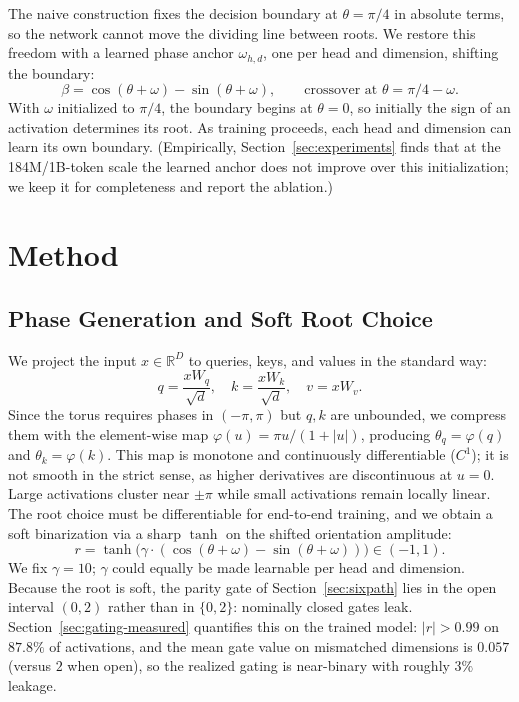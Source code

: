 \documentclass{article}
\newcommand{\R}{\mathbb{R}}
\begin{document}
The naive construction fixes the decision boundary at $\theta = \pi/4$ in absolute terms, so the network cannot move the dividing line between roots. We restore this freedom with a learned phase anchor $\omega_{h,d}$, one per head and dimension, shifting the boundary:
\begin{equation}
\beta = \cos(\theta + \omega) - \sin(\theta + \omega), \qquad \text{crossover at } \theta = \pi/4 - \omega.
\end{equation}
With $\omega$ initialized to $\pi/4$, the boundary begins at $\theta = 0$, so initially the sign of an activation determines its root. As training proceeds, each head and dimension can learn its own boundary. (Empirically, Section~\ref{sec:experiments} finds that at the 184M/1B-token scale the learned anchor does not improve over this initialization; we keep it for completeness and report the ablation.)

\section{Method}
\label{sec:method}

\subsection{Phase Generation and Soft Root Choice}
\label{sec:phasegen}

We project the input $x \in \R^D$ to queries, keys, and values in the standard way:
\begin{equation}
q = \frac{xW_q}{\sqrt{d}}, \quad k = \frac{xW_k}{\sqrt{d}}, \quad v = xW_v.
\end{equation}
Since the torus requires phases in $(-\pi, \pi)$ but $q, k$ are unbounded, we compress them with the element-wise map $\varphi(u) = \pi u / (1 + |u|)$, producing $\theta_q = \varphi(q)$ and $\theta_k = \varphi(k)$. This map is monotone and continuously differentiable ($C^1$); it is not smooth in the strict sense, as higher derivatives are discontinuous at $u = 0$. Large activations cluster near $\pm\pi$ while small activations remain locally linear. The root choice must be differentiable for end-to-end training, and we obtain a soft binarization via a sharp $\tanh$ on the shifted orientation amplitude:
\begin{equation}
r = \tanh\!\big(\gamma \cdot (\cos(\theta + \omega) - \sin(\theta + \omega))\big) \in (-1, 1).
\end{equation}
We fix $\gamma = 10$; $\gamma$ could equally be made learnable per head and dimension. Because the root is soft, the parity gate of Section~\ref{sec:sixpath} lies in the open interval $(0, 2)$ rather than in $\{0, 2\}$: nominally closed gates leak. Section~\ref{sec:gating-measured} quantifies this on the trained model: $|r| > 0.99$ on $87.8\%$ of activations, and the mean gate value on mismatched dimensions is $0.057$ (versus $2$ when open), so the realized gating is near-binary with roughly $3\%$ leakage.
\end{document}
